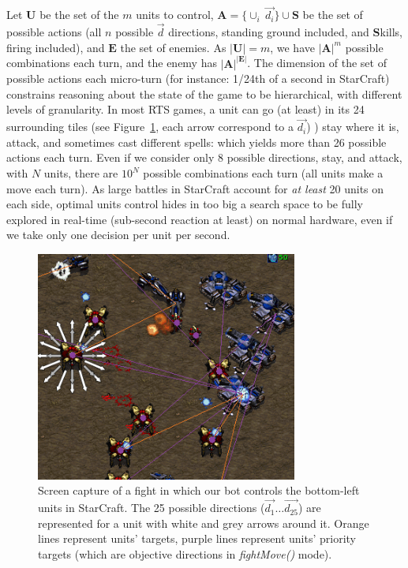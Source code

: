 Let $\mathbf{U}$ be the set of the $m$ units to control, $\mathbf{A} = \{\cup_i\ \vec{d_i}\} \cup \mathbf{S}$ be the set of possible actions (all $n$ possible $\vec{d}$ directions, standing ground included, and $\mathbf{S}$kills, firing included), and $\mathbf{E}$ the set of enemies. As $|\mathbf{U}| = m$, we have $|\mathbf{A}|^{m}$ possible combinations each turn, and the enemy has $|\mathbf{A}|^{|\mathbf{E}|}$. 
The dimension of the set of possible actions each micro-turn (for instance: 1/24th of a second in StarCraft) constrains reasoning about the state of the game to be hierarchical, with different levels of granularity. In most RTS games, a unit can go (at least) in its 24 surrounding tiles (see Figure~\ref{fig:sc_fight}, each arrow correspond to a $\vec{d_i}$)
) %
stay where it is, attack, and sometimes cast different spells: which yields more than 26 possible actions each turn. Even if we consider only 8 possible directions, stay, and attack, with $N$ units, there are $10^N$ possible combinations each turn (all units make a move each turn). As large battles in StarCraft account for \textit{at least} 20 units on each side, optimal units control hides in too big a search space to be fully explored in real-time (sub-second reaction at least) on normal hardware, even if we take only one decision per unit per second.

\begin{figure}
\begin{center}
\includegraphics[width=8.6cm]{images/SC_fight_3b.png}
\end{center}
\caption{Screen capture of a fight in which our bot controls the bottom-left units in StarCraft. The 25 possible directions ($\vec{d_1} \dots \vec{d_{25}}$) are represented for a unit with white and grey arrows around it. Orange lines represent units' targets, purple lines represent units' priority targets (which are objective directions in \textit{fightMove()} mode).}
\label{fig:sc_fight}
\end{figure}

